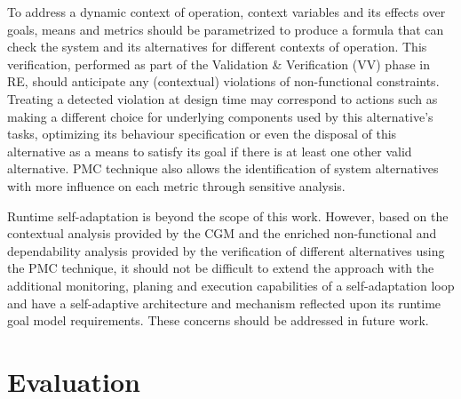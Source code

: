 To address a dynamic context of operation, context variables and its effects over goals, means and metrics should be parametrized to produce a formula that can check the system and its alternatives for different contexts of operation. This verification, performed as part of the Validation \& Verification (VV) phase in RE, should anticipate any (contextual) violations of non-functional constraints. Treating a detected violation at design time may correspond to actions such as making a different choice for underlying components used by this alternative's tasks, optimizing its behaviour specification or even the disposal of this alternative as a means to satisfy its goal if there is at least one other valid alternative. PMC technique also allows the identification of system alternatives with more influence on each metric through sensitive analysis. 

Runtime self-adaptation is beyond the scope of this work. However, based on the contextual analysis provided by the CGM and the enriched non-functional and dependability analysis provided by the verification of different alternatives using the PMC technique, it should not be difficult to extend the approach with the additional monitoring, planing and execution capabilities of a self-adaptation loop and have a self-adaptive architecture and mechanism reflected upon its runtime goal model requirements. These concerns should be addressed in future work.




\section{Evaluation}

